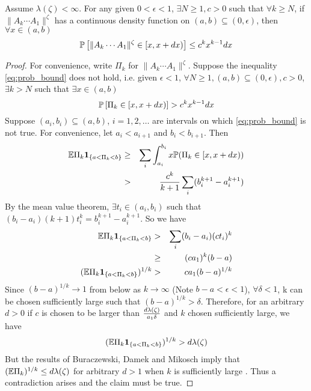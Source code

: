 \documentclass{article}
\begin{document}
\begin{lemma}\label{lemma:prob_bound}
  Assume $\lambda(\zeta) < \infty$. For any given $0 < \epsilon < 1$,
  $\exists N \geq 1, c > 0$ such that $\forall k \geq N$, if $\|A_k \cdots
  A_1\|^\zeta$ has a continuous density function on $(a, b) \subseteq
  (0, \epsilon)$, then $\forall x \in (a, b)$
  \begin{equation}
    \label{eq:prob_bound}
    \P\left[
      \|A_k \cdots A_1\|^\zeta \in [x, x + dx)
    \right] \leq c^k x^{k-1} dx
  \end{equation}
\end{lemma}
\begin{proof}
  For convenience, write $\Pi_k$ for $\|A_k \cdots A_1\|^\zeta$. Suppose
  the inequality \eqref{eq:prob_bound} does not hold, i.e. given
  $\epsilon < 1$, $\forall N \geq 1, (a, b) \subseteq (0, \epsilon), c
  > 0$, $\exists k > N$ such that $\exists x \in  (a, b)$
  \begin{equation*}
    \P\left[
      \Pi_k \in [x, x + dx)
    \right] > c^k x^{k-1} dx
  \end{equation*}
  Suppose $(a_i, b_i) \subseteq (a, b)$, $i = 1, 2, \dots$ are
  intervals on which \eqref{eq:prob_bound} is not true. For
  convenience, let $a_i < a_{i+1}$ and $b_i < b_{i+1}$. Then
  \begin{eqnarray*}
    \E \Pi_k \1{a < \Pi_k < b} &\geq&
    \sum_{i} \int_{a_i}^{b_i} x \P(\Pi_k \in [x, x+dx)) \\
    &>& {c^k \over k + 1} \sum_i
    (b_i^{k+1} - a_i^{k+1})
  \end{eqnarray*}
  By the mean value theorem, $\exists t_i \in (a_i, b_i)$ such that
  $(b_i - a_i)(k+1) t_i^k = b_i^{k+1} - a_i^{k+1}$. So we have
  \begin{eqnarray*}
    \E \Pi_k \1{a < \Pi_k < b} &>& \sum_i (b_i - a_i) (c t_i)^k \\
    &\geq& (c a_1)^k (b - a) \\
    (\E \Pi_k \1{a < \Pi_k < b})^{1/k} &>& c a_1 (b - a)^{1/k}
  \end{eqnarray*}
  Since $(b - a)^{1/k} \to 1$ from below as $k \to \infty$ (Note $b -
  a < \epsilon < 1$), $\forall \delta < 1$, k can be chosen
  sufficiently large such that $(b-a)^{1/k} > \delta$. Therefore, for
  an arbitrary $d > 0$ if $c$ is chosen to be larger than
  ${d\lambda(\zeta) \over a_1 \delta}$ and $k$ chosen sufficiently
  large, we have
  \[
  (\E \Pi_k \1{a < \Pi_k < b})^{1/k} > d \lambda(\zeta)
  \]
  But the results of Buraczewski, Damek and Mikosch imply that $(\E
  \Pi_k)^{1/k} \leq d \lambda(\zeta)$ for arbitrary $d > 1$ when $k$ is
  sufficiently large \cite{BuraczewskiDamekMikosch2015}. Thus a
  contradiction arises and the claim must be true.
\end{proof}
\end{document}
